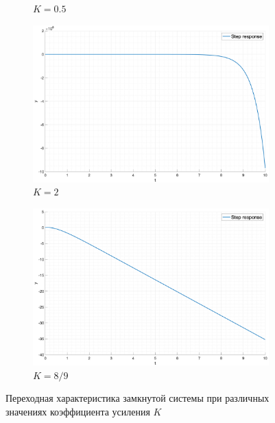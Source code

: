 \begin{figure}[ht!]
\begin{subfigure}{0.5\textwidth}
        \caption{$K = 0.5$}
    \end{subfigure}
    \begin{subfigure}{0.5\textwidth}
        \centering
        \includegraphics[width=\textwidth]{media/plots/task4_step_response_closed_3.png}
        \caption{$K = 2$}
    \end{subfigure}%
    \begin{subfigure}{0.5\textwidth}
        \centering
        \includegraphics[width=\textwidth]{media/plots/task4_step_response_closed_5.png}
        \caption{$K = 8/9$}
    \end{subfigure}
    \caption{Переходная характеристика замкнутой системы при различных значениях коэффициента усиления $K$}
    \label{fig:task4_step}
\end{figure}

